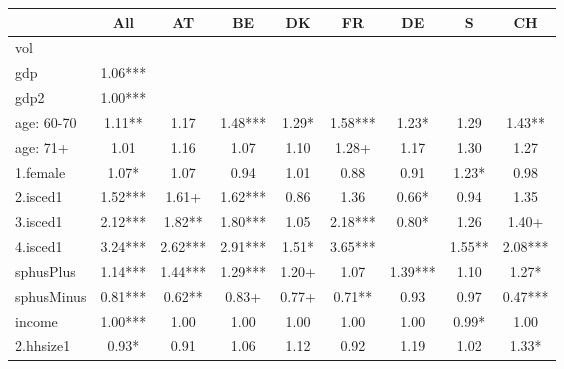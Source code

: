 {
\def\sym#1{\ifmmode^{#1}\else\(^{#1}\)\fi}
\begin{tabular}{l*{8}{c}}
\hline\hline
            &\multicolumn{1}{c}{All}&\multicolumn{1}{c}{AT}&\multicolumn{1}{c}{BE}&\multicolumn{1}{c}{DK}&\multicolumn{1}{c}{FR}&\multicolumn{1}{c}{DE}&\multicolumn{1}{c}{S}&\multicolumn{1}{c}{CH}\\
\hline
vol         &               &               &               &               &               &               &               &               \\
gdp         &        1.06***&               &               &               &               &               &               &               \\
gdp2        &        1.00***&               &               &               &               &               &               &               \\
age: 60-70  &        1.11** &        1.17   &        1.48***&        1.29*  &        1.58***&        1.23*  &        1.29   &        1.43** \\
age: 71+    &        1.01   &        1.16   &        1.07   &        1.10   &        1.28+  &        1.17   &        1.30   &        1.27   \\
1.female    &        1.07*  &        1.07   &        0.94   &        1.01   &        0.88   &        0.91   &        1.23*  &        0.98   \\
2.isced1    &        1.52***&        1.61+  &        1.62***&        0.86   &        1.36   &        0.66*  &        0.94   &        1.35   \\
3.isced1    &        2.12***&        1.82** &        1.80***&        1.05   &        2.18***&        0.80*  &        1.26   &        1.40+  \\
4.isced1    &        3.24***&        2.62***&        2.91***&        1.51*  &        3.65***&               &        1.55** &        2.08***\\
sphusPlus&        1.14***&        1.44***&        1.29***&        1.20+  &        1.07   &        1.39***&        1.10   &        1.27*  \\
sphusMinus&        0.81***&        0.62** &        0.83+  &        0.77+  &        0.71** &        0.93   &        0.97   &        0.47***\\
income      &        1.00***&        1.00   &        1.00   &        1.00   &        1.00   &        1.00   &        0.99*  &        1.00   \\
2.hhsize1   &        0.93*  &        0.91   &        1.06   &        1.12   &        0.92   &        1.19   &        1.02   &        1.33*  \\

\end{tabular}}
